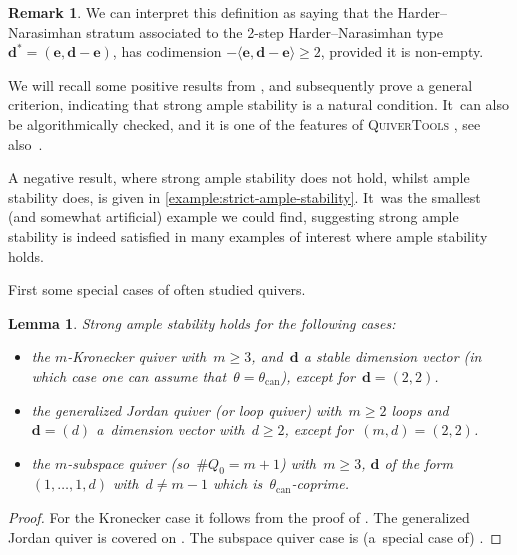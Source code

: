 \documentclass[JEP,XML,SOM,Unicode,NoEqCountersInSection,published]{cedram}
\theoremstyle{plain}
\newtheorem{lemma}[theorem]{Lemma}
\theoremstyle{definition}
\newtheorem{remark}[theorem]{Remark}
\newcommand\can{\ensuremath{\mathrm{can}}}
\newcommand\tuple[1]{\ensuremath{{\boldsymbol{#1}}}}
\begin{document}
\begin{remark}
We can interpret this definition as saying that
the Harder--Nara\-sim\-han stratum
associated to the 2-step Harder--Nara\-sim\-han type~$\tuple{d}^*=(\tuple{e},\tuple{d}-\tuple{e})$,
has codimension $-\langle \tuple{e}, \tuple{d} - \tuple{e} \rangle\geq 2$,
provided it is non-empty.
\end{remark}

We will recall some positive results from \cite{MR3683503,karen},
and subsequently prove a general criterion,
indicating that strong ample stability is a natural condition. It~can also be algorithmically checked,
and it is one of the features of \textsc{QuiverTools} \cite{quivertools},
see also~\cite{2506.19432}.

A negative result,
where strong ample stability does not hold,
whilst ample stability does,
is given in \cref{example:strict-ample-stability}. It~was the smallest
(and somewhat artificial) example
we could find,
suggesting strong ample stability is indeed satisfied in many examples of interest
where ample stability holds.

First some special cases of often studied quivers.
\begin{lemma}
\label{lemma:strong-ample-stability-examples}
Strong ample stability holds for the following cases:
\begin{itemize}
\item the $m$-Kronecker quiver with~$m\geq 3$,
and~$\tuple{d}$ a stable dimension vector
(in which case one can assume that~$\theta=\theta_\can$),
except for~$\tuple{d}=(2,2)$.
\item the generalized Jordan quiver (or loop quiver)
with~$m\geq 2$ loops
and~$\tuple{d}=(d)$ a~dimension vector with~$d\geq 2$,
except for~$(m,d)=(2,2)$.
\item the $m$-subspace quiver (so~$\#Q_0=m+1$) with~$m\geq 3$,
$\tuple{d}$ of the form~$(1,\ldots,1,d)$ with~$d\neq m-1$
which is~$\theta_\can$-coprime.
\end{itemize}
\end{lemma}

\begin{proof}
For the Kronecker case it follows from the proof of \cite[Prop.\,6.2]{MR3683503}.
The generalized Jordan quiver is covered on \cite[p.\,460]{MR3683503}.
The subspace quiver case is (a~special case of) \cite[Th.\,3.3.4]{karen}.
\end{proof}
\end{document}
